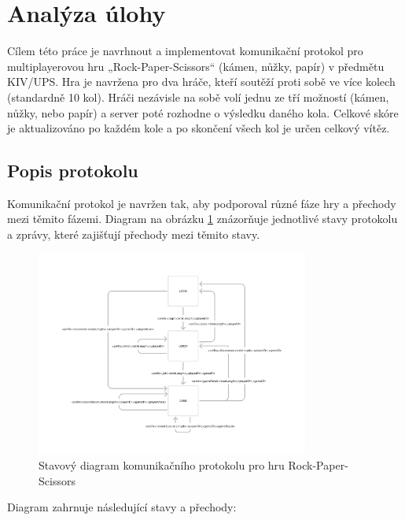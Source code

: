 \documentclass[12pt, a4paper]{article}
\begin{document}
\section{Analýza úlohy}

Cílem této práce je navrhnout a implementovat komunikační protokol pro multiplayerovou hru „Rock-Paper-Scissors“ (kámen, nůžky, papír) v předmětu KIV/UPS. Hra je navržena pro dva hráče, kteří soutěží proti sobě ve více kolech (standardně 10 kol). Hráči nezávisle na sobě volí jednu ze tří možností (kámen, nůžky, nebo papír) a server poté rozhodne o výsledku daného kola. Celkové skóre je aktualizováno po každém kole a po skončení všech kol je určen celkový vítěz.

\subsection{Popis protokolu}

Komunikační protokol je navržen tak, aby podporoval různé fáze hry a přechody mezi těmito fázemi. Diagram na obrázku \ref{fig:protocol} znázorňuje jednotlivé stavy protokolu a zprávy, které zajišťují přechody mezi těmito stavy.

\begin{figure}[H]
    \centering
    \includegraphics[width=0.8\textwidth]{img/protocol.png}
    \caption{Stavový diagram komunikačního protokolu pro hru Rock-Paper-Scissors}
    \label{fig:protocol}
\end{figure}

Diagram zahrnuje následující stavy a přechody:
\end{document}
